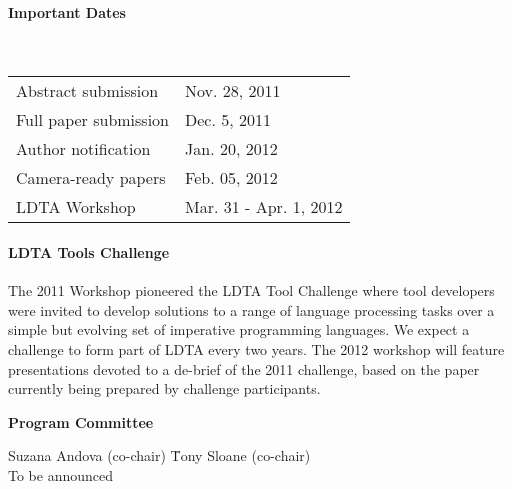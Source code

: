 \documentclass[letterpaper, twocolumn, 9pt]{article}
\begin{document}
\paragraph{\textsf{Important Dates}} ~

\vspace{5pt}
\hspace{-0.20in}
\begin{tabular}{ll}
Abstract submission & Nov. 28, 2011\\
Full paper submission & Dec. 5, 2011\\
Author notification & Jan. 20, 2012\\
Camera-ready papers & Feb. 05, 2012\\
LDTA Workshop & Mar. 31 - Apr. 1, 2012
\end{tabular}

\paragraph{\textsf{LDTA Tools Challenge}}
The 2011 Workshop pioneered the LDTA Tool Challenge where tool
developers were invited to develop solutions to a range of language
processing tasks over a simple but evolving set of imperative
programming languages. We expect a challenge to form part of LDTA
every two years. The 2012 workshop will feature presentations devoted
to a de-brief of the 2011 challenge, based on the paper currently
being prepared by challenge participants.

\vspace{3pt}
\hspace{-0.20in}
{\bfseries\textsf{Program Committee}}\\
{\small
\vspace{-9pt}
\begin{tabbing}
Suzana Andova (co-chair) \hspace{1.25cm}\= Tony Sloane (co-chair)\\
To be announced\\
\end{tabbing}
}
\end{document}
